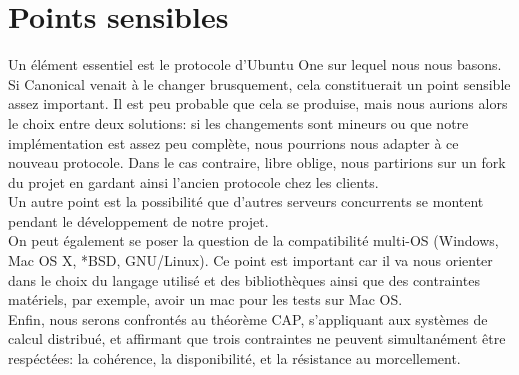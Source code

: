 \section{Points sensibles}
Un élément essentiel est le protocole d'Ubuntu One sur lequel nous nous basons. Si Canonical venait à le changer brusquement, cela constituerait un point sensible assez important. Il est peu probable que cela se produise, mais nous aurions alors le choix entre deux solutions: si les changements sont mineurs ou que notre implémentation est assez peu complète, nous pourrions nous adapter à ce nouveau protocole. Dans le cas contraire, libre oblige, nous partirions sur un fork du projet en gardant ainsi l'ancien protocole chez les clients.\\

Un autre point est la possibilité que d'autres serveurs concurrents se montent pendant le développement de notre projet.\\

On peut également se poser la question de la compatibilité multi-OS (Windows, Mac OS X, *BSD, GNU/Linux). Ce point est important car il va nous orienter dans le choix du langage utilisé et des bibliothèques ainsi que des contraintes matériels, par exemple, avoir un mac pour les tests sur Mac OS.\\

Enfin, nous serons confrontés au théorème CAP, s'appliquant aux systèmes de calcul distribué, et affirmant que trois contraintes ne peuvent simultanément être respéctées: la cohérence, la disponibilité, et la résistance au morcellement.
